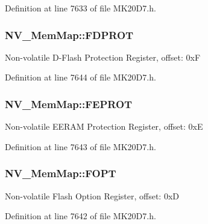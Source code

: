 Definition at line 7633 of file M\+K20\+D7.\+h.

\subsubsection[{\texorpdfstring{F\+D\+P\+R\+OT}{FDPROT}}]{ N\+V\+\_\+\+Mem\+Map\+::\+F\+D\+P\+R\+OT}\hypertarget{struct_n_v___mem_map_a335c056263e0dae36f7a3bb82d08bce8}{}\label{struct_n_v___mem_map_a335c056263e0dae36f7a3bb82d08bce8}
Non-\/volatile D-\/\+Flash Protection Register, offset\+: 0xF 

Definition at line 7644 of file M\+K20\+D7.\+h.

\subsubsection[{\texorpdfstring{F\+E\+P\+R\+OT}{FEPROT}}]{ N\+V\+\_\+\+Mem\+Map\+::\+F\+E\+P\+R\+OT}\hypertarget{struct_n_v___mem_map_a8de06ecef5c15ac5c29f613d79c9e491}{}\label{struct_n_v___mem_map_a8de06ecef5c15ac5c29f613d79c9e491}
Non-\/volatile E\+E\+R\+AM Protection Register, offset\+: 0xE 

Definition at line 7643 of file M\+K20\+D7.\+h.

\subsubsection[{\texorpdfstring{F\+O\+PT}{FOPT}}]{ N\+V\+\_\+\+Mem\+Map\+::\+F\+O\+PT}\hypertarget{struct_n_v___mem_map_a3a3c0ec53723a865f6686bf4696800ba}{}\label{struct_n_v___mem_map_a3a3c0ec53723a865f6686bf4696800ba}
Non-\/volatile Flash Option Register, offset\+: 0xD 

Definition at line 7642 of file M\+K20\+D7.\+h.

